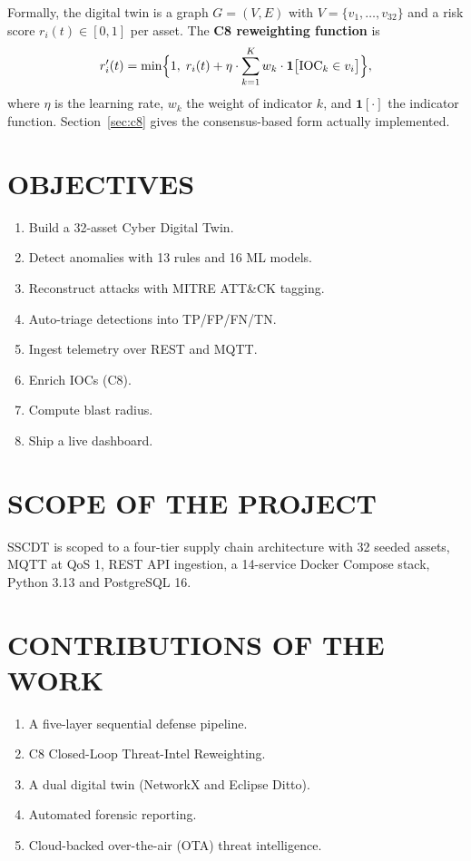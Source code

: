 \documentclass[12pt,a4paper]{amritareport}
\begin{document}
Formally, the digital twin is a graph $G = (V, E)$ with $V = \{v_1, \ldots, v_{32}\}$ and a risk score $r_i(t)\in[0,1]$ per asset. The \textbf{C8 reweighting function} is
\begin{equation}
r_i'(t) = \min\Bigl\{1,\; r_i(t) + \eta \cdot \sum_{k=1}^{K} w_k \cdot \mathbf{1}\bigl[\text{IOC}_k \in v_i\bigr]\Bigr\},
\end{equation}
where $\eta$ is the learning rate, $w_k$ the weight of indicator $k$, and $\mathbf{1}[\cdot]$ the indicator function. Section~\ref{sec:c8} gives the consensus-based form actually implemented.

\section{OBJECTIVES}

\begin{enumerate}
    \item Build a 32-asset Cyber Digital Twin.
    \item Detect anomalies with 13 rules and 16 ML models.
    \item Reconstruct attacks with MITRE ATT\&CK tagging.
    \item Auto-triage detections into TP/FP/FN/TN.
    \item Ingest telemetry over REST and MQTT.
    \item Enrich IOCs (C8).
    \item Compute blast radius.
    \item Ship a live dashboard.
\end{enumerate}

\section{SCOPE OF THE PROJECT}

SSCDT is scoped to a four-tier supply chain architecture with 32 seeded assets, MQTT at QoS 1, REST API ingestion, a 14-service Docker Compose stack, Python 3.13 and PostgreSQL 16.

\section{CONTRIBUTIONS OF THE WORK}

\begin{enumerate}
    \item A five-layer sequential defense pipeline.
    \item C8 Closed-Loop Threat-Intel Reweighting.
    \item A dual digital twin (NetworkX and Eclipse Ditto).
    \item Automated forensic reporting.
    \item Cloud-backed over-the-air (OTA) threat intelligence.
\end{enumerate}
\end{document}
